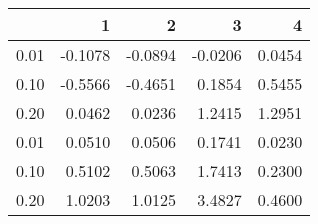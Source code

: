 \begin{tabular}{lrrrr}
\toprule
{} &       1 &       2 &       3 &       4 \\
\midrule
0.01 & -0.1078 & -0.0894 & -0.0206 &  0.0454 \\
0.10 & -0.5566 & -0.4651 &  0.1854 &  0.5455 \\
0.20 &  0.0462 &  0.0236 &  1.2415 &  1.2951 \\
0.01 &  0.0510 &  0.0506 &  0.1741 &  0.0230 \\
0.10 &  0.5102 &  0.5063 &  1.7413 &  0.2300 \\
0.20 &  1.0203 &  1.0125 &  3.4827 &  0.4600 \\
\bottomrule
\end{tabular}
